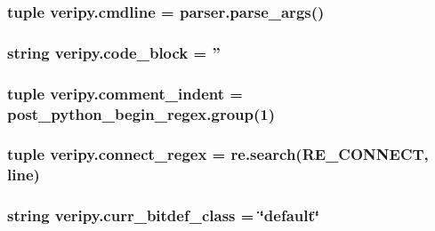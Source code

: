 \hypertarget{namespaceveripy_ad6c4cf7e3033a574cb4412b464af3966}{
\subsubsection[{cmdline}]{\setlength{\rightskip}{0pt plus 5cm}tuple veripy.\-cmdline = parser.\-parse\-\_\-args()}}\label{namespaceveripy_ad6c4cf7e3033a574cb4412b464af3966}
\hypertarget{namespaceveripy_a08971c7a0053dfc5c58e4e443ce24122}{
\subsubsection[{code\-\_\-block}]{\setlength{\rightskip}{0pt plus 5cm}string veripy.\-code\-\_\-block = ''}}\label{namespaceveripy_a08971c7a0053dfc5c58e4e443ce24122}
\hypertarget{namespaceveripy_a1767132c455069ae2f3d3eecfe441abd}{
\subsubsection[{comment\-\_\-indent}]{\setlength{\rightskip}{0pt plus 5cm}tuple veripy.\-comment\-\_\-indent = post\-\_\-python\-\_\-begin\-\_\-regex.\-group(1)}}\label{namespaceveripy_a1767132c455069ae2f3d3eecfe441abd}
\hypertarget{namespaceveripy_aa1760ba945c51eae52f028d1bbbd7fc1}{
\subsubsection[{connect\-\_\-regex}]{\setlength{\rightskip}{0pt plus 5cm}tuple veripy.\-connect\-\_\-regex = re.\-search(R\-E\-\_\-\-C\-O\-N\-N\-E\-C\-T, {\bf line})}}\label{namespaceveripy_aa1760ba945c51eae52f028d1bbbd7fc1}
\hypertarget{namespaceveripy_a63f627df880e333c4aa052dcaf2cce59}{
\subsubsection[{curr\-\_\-bitdef\-\_\-class}]{\setlength{\rightskip}{0pt plus 5cm}string veripy.\-curr\-\_\-bitdef\-\_\-class = \char`\"{}default\char`\"{}}}\label{namespaceveripy_a63f627df880e333c4aa052dcaf2cce59}
